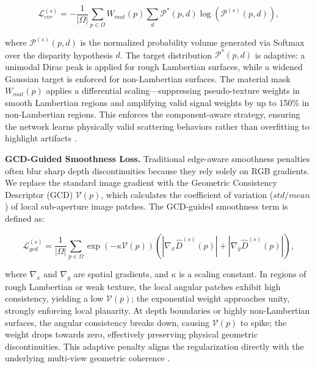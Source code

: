 \documentclass[lettersize,journal]{IEEEtran}
\begin{document}
\begin{equation}
\mathcal{L}_{cvr}^{(s)} = - \frac{1}{|\Omega|} \sum_{p \in \Omega} W_{mat}(p) \sum_{d} \mathcal{P}^{*}(p,d) \log \left( \mathcal{P}^{(s)}(p,d) \right),
\label{eq:cv_loss}
\end{equation}

where $\mathcal{P}^{(s)}(p,d)$ is the normalized probability volume generated via Softmax over the disparity hypothesis $d$. The target distribution $\mathcal{P}^{*}(p,d)$ is adaptive: a unimodal Dirac peak is applied for rough Lambertian surfaces, while a widened Gaussian target is enforced for non-Lambertian surfaces. The material mask $W_{mat}(p)$ applies a differential scaling—suppressing pseudo-texture weights in smooth Lambertian regions and amplifying valid signal weights by up to 150\% in non-Lambertian regions. This enforces the component-aware strategy, ensuring the network learns physically valid scattering behaviors rather than overfitting to highlight artifacts \cite{wang2023}.

\textbf{GCD-Guided Smoothness Loss.} 
Traditional edge-aware smoothness penalties often blur sharp depth discontinuities because they rely solely on RGB gradients. We replace the standard image gradient with the Geometric Consistency Descriptor (GCD) $\mathcal{V}(p)$, which calculates the coefficient of variation ($std/mean$) of local sub-aperture image patches. The GCD-guided smoothness term is defined as:

\begin{equation}
\mathcal{L}_{gcd}^{(s)} = \frac{1}{|\Omega|} \sum_{p \in \Omega} \exp\left(-\kappa \mathcal{V}(p)\right) \left( \left| \nabla_x \hat{D}^{(s)}(p) \right| + \left| \nabla_y \hat{D}^{(s)}(p) \right| \right),
\label{eq:gcd_loss}
\end{equation}

where $\nabla_x$ and $\nabla_y$ are spatial gradients, and $\kappa$ is a scaling constant. In regions of rough Lambertian or weak texture, the local angular patches exhibit high consistency, yielding a low $\mathcal{V}(p)$; the exponential weight approaches unity, strongly enforcing local planarity. At depth boundaries or highly non-Lambertian surfaces, the angular consistency breaks down, causing $\mathcal{V}(p)$ to spike; the weight drops towards zero, effectively preserving physical geometric discontinuities. This adaptive penalty aligns the regularization directly with the underlying multi-view geometric coherence \cite{godard2019}.
\end{document}
